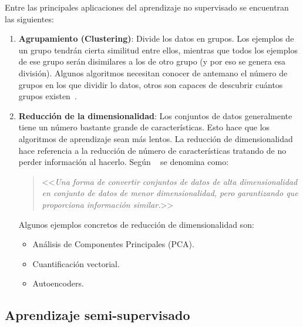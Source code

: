 Entre las principales aplicaciones del aprendizaje no supervisado se encuentran las siguientes:
\vspace{-4px}
\begin{enumerate}
    \item \textbf{Agrupamiento (Clustering)}: Divide los datos en grupos. Los ejemplos de un grupo tendrán cierta similitud entre ellos, mientras que todos los ejemplos de ese grupo serán disimilares a los de otro grupo (y por eso se genera esa división). Algunos algoritmos necesitan conocer de antemano el número de grupos en los que dividir lo datos, otros son capaces de descubrir cuántos grupos existen~\cite{salim:usl}.
    \item \textbf{Reducción de la dimensionalidad}: Los conjuntos de datos generalmente tiene un número bastante grande de características. Esto hace que los algoritmos de aprendizaje sean más lentos. La reducción de dimensionalidad hace referencia a la reducción de número de características tratando de no perder información al hacerlo.
    Según
   ~\cite{javatpoint:reduccionsdims} se denomina
    como: \begin{quote}<<\textit{Una forma de convertir conjuntos de datos de alta dimensionalidad en
    conjunto de datos de menor dimensionalidad, pero garantizando que proporciona
    información similar.}>>\end{quote} 
    
    Algunos ejemplos concretos de reducción de dimensionalidad son:
    \begin{itemize}
        \item Análisis de Componentes Principales (PCA).
        \item Cuantificación vectorial.
        \item Autoencoders.
    \end{itemize}
\end{enumerate}


\subsection{Aprendizaje semi-supervisado}
\label{aprendizaje-semi-supervisado}

